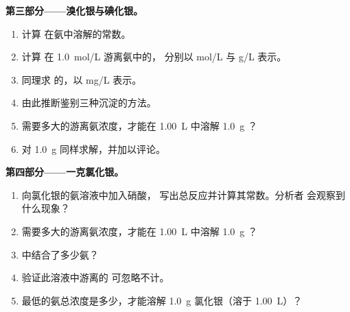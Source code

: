 \begin{problem}
\medskip
\noindent\textbf{第三部分——溴化银与碘化银。}
\begin{enumerate}[resume]
  \item 计算  在氨中溶解的常数。
  \item 计算  在 \qty{1.0}{mol/L} 游离氨中的，
        分别以 \unit{mol/L} 与 \unit{g/L} 表示。
  \item 同理求  的，以 \unit{mg/L} 表示。
  \item 由此推断鉴别三种沉淀的方法。
  \item 需要多大的游离氨浓度，才能在
        \qty{1.00}{L} 中溶解 \qty{1.0}{g} ？
  \item 对 \qty{1.0}{g}  同样求解，并加以评论。
\end{enumerate}

\medskip
\noindent\textbf{第四部分——一克氯化银。}
\begin{enumerate}[resume]
  \item 向氯化银的氨溶液中加入硝酸，
        写出总反应并计算其常数。分析者
        会观察到什么现象？
  \item 需要多大的游离氨浓度，才能在
        \qty{1.00}{L} 中溶解 \qty{1.0}{g} ？
  \item {}中结合了多少氨？
  \item 验证此溶液中游离的  可忽略不计。
  \item 最低的氨总浓度是多少，才能溶解
        \qty{1.0}{g} 氯化银（溶于 \qty{1.00}{L}）？
\end{enumerate}
\end{problem}

